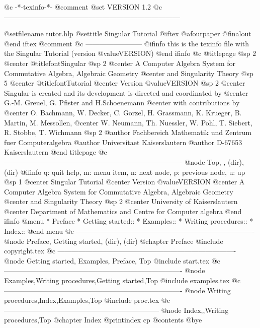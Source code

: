     @c -*-texinfo-*-
@comment %
@set VERSION 1.2
@c ---------------------------------------------------------------------------

@setfilename tutor.hlp
@settitle Singular Tutorial
@iftex
@afourpaper
@finalout
@end iftex
@comment %
@c ------------------------
@ifinfo
this is the texinfo file with the Singular Tutorial (version @value{VERSION})
@end ifinfo
@c
@titlepage
@sp 2
@center @titlefont{Singular}
@sp 2
@center A Computer Algebra System for Commutative Algebra, Algebraic Geometry
@center  and Singularity Theory
@sp 5
@center @titlefont{Tutorial}
@center Version @value{VERSION}
@sp 2
@center Singular is created and its development is directed and coordinated by
@center G.-M. Greuel, G. Pfister and H.Schoenemann
@center with contributions by
@center O. Bachmann, W. Decker, C. Gorzel, H. Grassmann, K. Krueger, B. Martin, M. Messollen,
@center W. Neumann, Th. Nuessler, W. Pohl, T. Siebert, R. Stobbe, T. Wichmann
@sp 2
@author Fachbereich Mathematik und Zentrum fuer Computeralgebra
@author Universitaet Kaiserslautern
@author D-67653 Kaiserslautern
@end titlepage
@c ----------------------------------------------------------------------------
@node    Top, ,    (dir),    (dir)
@ifinfo
q: quit help, m: menu item, n: next node, p: previous node, u: up
@sp 1
@center Singular Tutorial
@center Version @value{VERSION}
@center A Computer Algebra System for Commutative Algebra, Algebraic Geometry
@center and Singularity Theory
@sp 2
@center University of Kaiserslautern
@center Department of Mathematics and Centre for Computer algebra
@end ifinfo
@menu
* Preface
* Getting started::
* Examples::
* Writing procedures::
* Index::
@end menu
@c ----------------------------------------------------------------------------
@node Preface, Getting started, (dir),  (dir)
@chapter Preface
@include copyright.tex
@c ----------------------------------------------------------------------------
@node Getting started, Examples, Preface, Top
@include start.tex
@c ----------------------------------------------------------------------------
@node Examples,Writing procedures,Getting started,Top
@include examples.tex
@c ----------------------------------------------------------------------------
@node Writing procedures,Index,Examples,Top
@include proc.tex
@c ------------------------------------------------------------------
@node Index,,Writing procedures,Top
@chapter Index
@printindex cp
@contents
@bye

